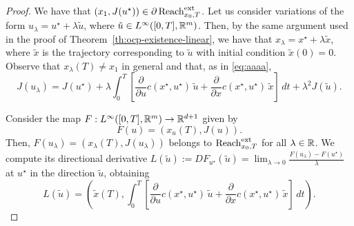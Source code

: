 \begin{proof}
    We have that $(x_1,J(u^\star))\in \partial \operatorname{Reach}^{\text{ext}}_{x_0,T}$. 
    Let us consider variations of the form $u_\lambda = u^\star + \lambda \tilde u$, where $\tilde u\in L^\infty([0,T],\mathbb{R}^m)$.
    Then, by the same argument used in the proof of Theorem~\ref{th:ocp-existence-linear}, we have that $x_\lambda = x^\star + \lambda \tilde x$, where $\tilde x$ is the trajectory corresponding to $\tilde u$ with initial condition $\tilde x(0)=0$. Observe that $x_\lambda(T)\neq x_1$ in general and that, as in \eqref{eq:aaaa}, 
    \begin{equation}
        \label{eq:aaaa2}
        J(u_\lambda) = J(u^\star) + \lambda \int_0^T \left[ \frac{\partial}{\partial u} c(x^\star, u^\star) \,\tilde u + \frac{\partial}{\partial x}c(x^\star, u^\star) \, \tilde x  \right] \, dt + \lambda^2 J(\tilde u).
    \end{equation}

    Consider the map $F:L^\infty([0,T],\mathbb{R}^m) \to \mathbb{R}^{d+1}$ given by
    \begin{equation}
        F(u) = (x_u(T), J(u)).
    \end{equation}
    Then, $F(u_\lambda) = (x_\lambda(T), J(u_\lambda))$ belongs to $\operatorname{Reach}^{\text{ext}}_{x_0,T}$ for all $\lambda\in \mathbb{R}$. 
    We compute its directional derivative $L(\tilde u):=DF_{u^\star}(\tilde u) 
        = \lim_{\lambda\to 0} \frac{F(u_\lambda)-F(u^\star)}{\lambda}$ at $u^\star$ in the direction $\tilde u$, obtaining
    \begin{equation}
        L(\tilde u)
        = \left( \tilde x(T), \int_0^T \left[ \frac{\partial}{\partial u} c(x^\star, u^\star) \, \tilde u + \frac{\partial}{\partial x}c(x^\star, u^\star) \, \tilde x  \right] \, dt   \right).
    \end{equation}


\end{proof}
